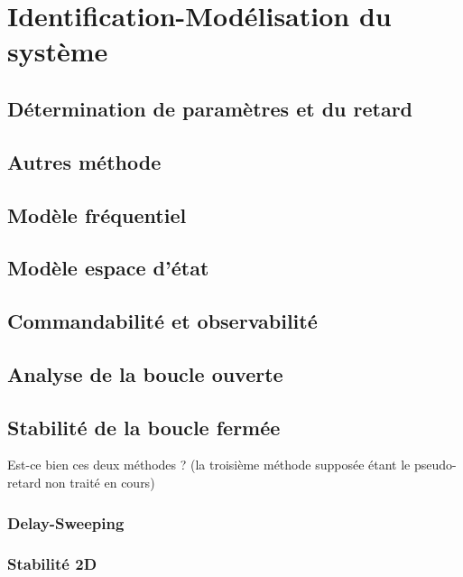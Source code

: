 \chapter{Identification-Modélisation du système}
	\section{Détermination de paramètres et du retard}
	\section{Autres méthode}
	\section{Modèle fréquentiel}
	\section{Modèle espace d'état}
	\section{Commandabilité et observabilité}
	\section{Analyse de la boucle ouverte}
	\section{Stabilité de la boucle fermée}
	Est-ce bien ces deux méthodes ? (la troisième méthode supposée étant le pseudo-retard non traité en cours)
		\subsection{Delay-Sweeping}
		\subsection{Stabilité 2D}


